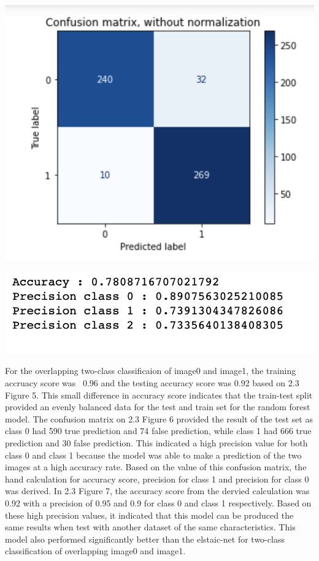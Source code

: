 \documentclass[12pt]{article}
\begin{document}
\begin{multicols*}{2}
\begin{center}
            \includegraphics[scale=0.5]{../screenshot/Rf-Non-Overlapping01/cf.png}

        \includegraphics[scale=0.5]{../screenshot/Rf-Non-Overlapping012/calc_score.png}
  \end{center}

  \hspace*{5mm} For the overlapping two-class classificaion of image0 and image1, the training accruacy score was ~0.96 and the testing
  accuracy score was 0.92 based on 2.3 Figure 5. This small difference in accuracy score indicates that the train-test split provided an evenly balanced data for the test and train
  set for the random forest model. The confusion matrix on 2.3 Figure 6 provided the result of the test set as class 0 had 590 true prediction and 74 false prediction,
  while class 1 had 666 true prediction and 30 false prediction. This indicated a high precision value for both class 0 and class 1 because the model
  was able to make a prediction of the two images at a high accuracy rate. Based on the value of this confusion matrix, the hand calculation for accuracy score,
  precision for class 1 and precision for class 0 was derived. In 2.3 Figure 7, the accuracy score from the dervied calculation was 0.92 with a precision of 0.95 and 0.9
  for class 0 and class 1 respectively. Based on these high precision values, it indicated that this model can be produced the same results when test with another
  dataset of the same characteristics. This model also performed significantly better than the elstaic-net for two-class classification of overlapping
  image0 and image1. 


\end{multicols*}
\end{document}
